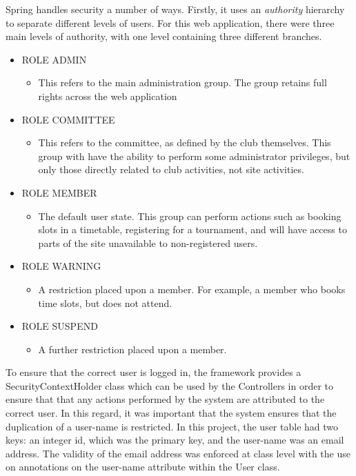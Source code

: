 Spring handles security a number of ways. Firstly, it uses an \textit{authority} hierarchy to separate different levels of users. For this web application, there were three main levels of authority, with one level containing three different branches.

\begin{itemize}
\item ROLE ADMIN
\begin{itemize}
\item This refers to the main administration group. The group retains full rights across the web application
\end{itemize}
\item ROLE COMMITTEE
\begin{itemize}
\item This refers to the committee, as defined by the club themselves. This group with have the ability to perform some administrator privileges, but only those directly related to club activities, not site activities.
\end{itemize}
\item ROLE MEMBER
\begin{itemize}
\item The default user state. This group can perform actions such as booking slots in a timetable, registering for a tournament, and will have access to parts of the site unavailable to non-registered users.
\end{itemize}
\item ROLE WARNING 
\begin{itemize}
\item A restriction placed upon a member. For example, a member who books time slots, but does not attend.
\end{itemize}
\item ROLE SUSPEND
\begin{itemize}
\item A further restriction placed upon a member.
\end{itemize}
\end{itemize}

To ensure that the correct user is logged in, the framework provides a SecurityContextHolder class which can be used by the Controllers in order to ensure that that any actions performed by the system are attributed to the correct user. In this regard, it was important that the system ensures that the duplication of a user-name is restricted. In this project, the user table had two keys: an integer id, which was the primary key, and the user-name was an email address. The validity of the email address was enforced at class level with the use on annotations on the user-name attribute within the User class. \newline

